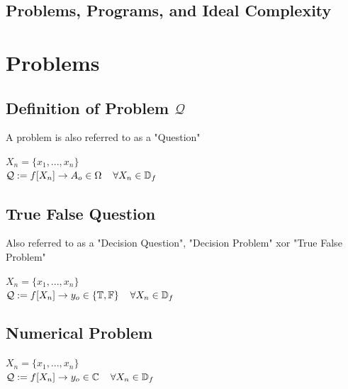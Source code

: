 \documentclass[11pt]{article}
\begin{document}
\begin{center}
\section*{Problems, Programs, and Ideal Complexity}
\end{center}




\section{Problems}

\subsection{Definition of Problem $\mathcal{Q}$}
A problem is also referred to as a "Question"
\begin{center}
\vspace{2mm}
$
X_n = \{x_1,...,x_n\}
$
\\ \vspace{4mm}
$
\mathcal{Q} := f\lbrack X_n \rbrack \rightarrow A_o \in \Omega \hspace{4mm} \forall X_n \in \mathbb{D}_{f}
$
\end{center}

\subsection{True False Question}
Also referred to as a "Decision Question", "Decision Problem" xor "True False Problem"
\begin{center}
\vspace{2mm}
$
X_n = \{x_1,...,x_n\}
$
\\ \vspace{4mm}
$
\mathcal{Q} := f\lbrack X_n \rbrack \rightarrow y_o \in \{\mathbb{T},\mathbb{F}\} \hspace{4mm} \forall X_n \in \mathbb{D}_{f}
$
\end{center}

\subsection{Numerical Problem}
\begin{center}
\vspace{2mm}
$
X_n = \{x_1,...,x_n\}
$
\\ \vspace{4mm}
$
\mathcal{Q} := f\lbrack X_n \rbrack \rightarrow y_o \in \mathbb{C} \hspace{4mm} \forall X_n \in \mathbb{D}_{f}
$
\end{center}
\end{document}
